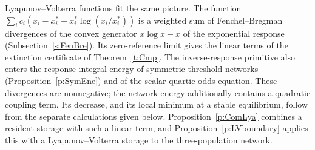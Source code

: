 \begin{enumerate}
Lyapunov--Volterra functions fit the same picture.
The function $\sum_ic_i(x_i-x_i^*-x_i^*\log(x_i/x_i^*))$ is a weighted sum of Fenchel--Bregman
divergences of the convex generator $x\log x-x$ of the exponential response
(Subsection~\ref{s:FenBre}). Its zero-reference limit gives the linear terms of the extinction
certificate of Theorem~\ref{t:Cmp}. The inverse-response primitive also enters the
response-integral energy of symmetric threshold networks (Proposition~\ref{p:SymEne}) and of the
scalar quartic odds equation. These divergences are nonnegative; the network
energy additionally contains a quadratic coupling term. Its decrease, and its local minimum at a
stable equilibrium, follow from the separate calculations given below.
Proposition~\ref{p:ComLya} combines a resident storage with such a linear term, and Proposition~\ref{p:LVboundary} applies this with a Lyapunov--Volterra storage to the three-population network.
\end{enumerate}

